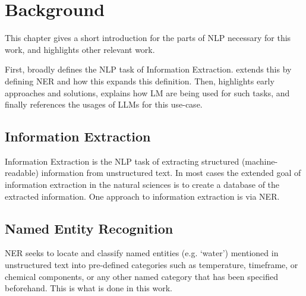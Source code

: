 \chapter{Background}\label{chap:background}

This chapter gives a short introduction for the parts of \acrlong{NLP} necessary for this work, and highlights other relevant work.

First,  broadly defines the \gls{NLP} task of Information Extraction.
 extends this by defining \gls{NER} and how this expands this definition.
Then,  highlights early approaches and solutions,  explains how \gls{LM} are being used for such tasks, and finally  references the usages of \glspl{LLM} for this use-case.




%


\section{Information Extraction}\label{sec:extraction}
Information Extraction is the \gls{NLP} task of extracting structured (machine-readable) information from unstructured text.
In most cases the extended goal of information extraction in the natural sciences is to create a database of the extracted information.
One approach to information extraction is via \gls{NER}.

\section{Named Entity Recognition}\label{sec:NER}
\gls{NER} seeks to locate and classify named entities (e.g. `water') mentioned in unstructured text into pre-defined categories \cite{li_survey_2022} such as temperature, timeframe, or chemical components, or any other named category that has been specified beforehand.
This is what is done in this work.

